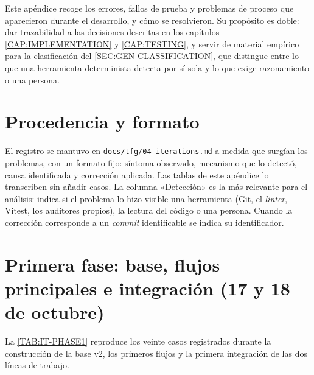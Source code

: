 
Este apéndice recoge los errores, fallos de prueba y problemas de proceso que
aparecieron durante el desarrollo, y cómo se resolvieron. Su propósito es doble:
dar trazabilidad a las decisiones descritas en los capítulos \ref{CAP:IMPLEMENTATION}
y \ref{CAP:TESTING}, y servir de material empírico para la clasificación del
\cref{SEC:GEN-CLASSIFICATION}, que distingue entre lo que una herramienta
determinista detecta por sí sola y lo que exige razonamiento o una persona.

\section*{Procedencia y formato}
El registro se mantuvo en \texttt{docs/tfg/04-iterations.md} a medida que surgían
los problemas, con un formato fijo: síntoma observado, mecanismo que lo detectó,
causa identificada y corrección aplicada. Las tablas de este apéndice lo
transcriben sin añadir casos. La columna «Detección» es la más relevante para el
análisis: indica si el problema lo hizo visible una herramienta (Git, el
\textit{linter}, Vitest, los auditores propios), la lectura del código o una
persona. Cuando la corrección corresponde a un \textit{commit} identificable se
indica su identificador.

\section*{Primera fase: base, flujos principales e integración (17 y 18 de octubre)}

La \cref{TAB:IT-PHASE1} reproduce los veinte casos registrados durante la
construcción de la base v2, los primeros flujos y la primera integración de las
dos líneas de trabajo.

